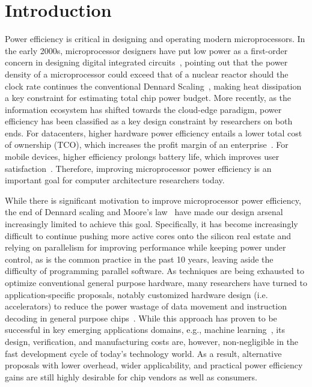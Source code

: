 
\chapter{Introduction}
\label{sec:intro}

Power efficiency is critical in designing and operating modern microprocessors. In the early 2000s, microprocessor designers have put low power as a first-order concern in designing digital integrated circuits~\cite{pedram2002power, rabaey2009low}, pointing out that the power density of a microprocessor could exceed that of a nuclear reactor should the clock rate continues the conventional Dennard Scaling~\cite{rabaey2002digital}, making heat dissipation a key constraint for estimating total chip power budget. More recently, as the information ecosystem has shifted towards the cloud-edge paradigm, power efficiency has been classified as a key design constraint by researchers on both ends. For datacenters, higher hardware power efficiency entails a lower total cost of ownership (TCO), which increases the profit margin of an enterprise~\cite{barroso2013datacenter}. For mobile devices, higher efficiency prolongs battery life, which improves user satisfaction~\cite{zhu2017energy}. Therefore, improving microprocessor power efficiency is an important goal for computer architecture researchers today.

While there is significant motivation to improve microprocessor power efficiency, the end of Dennard scaling and Moore's law~\cite{esmaeilzadeh2011dark,theis2017end} have made our design arsenal increasingly limited to achieve this goal. Specifically, it has become increasingly difficult to continue pushing more active cores onto the silicon real estate and relying on parallelism for improving performance while keeping power under control, as is the common practice in the past 10 years, leaving aside the difficulty of programming parallel software. As techniques are being exhausted to optimize conventional general purpose hardware, many researchers have turned to application-specific proposals, notably customized hardware design (i.e. accelerators) to reduce the power wastage of data movement and instruction decoding in general purpose chips~\cite{qadeer2015convolution}. While this approach has proven to be successful in key emerging applications domains, e.g., machine learning~\cite{chen2014diannao, jouppi2017datacenter, caulfield2016cloud, dean2018new}, its design, verification, and manufacturing costs are, however, non-negligible in the fast development cycle of today's technology world. As a result, alternative proposals with lower overhead, wider applicability, and practical power efficiency gains are still highly desirable for chip vendors as well as consumers.

